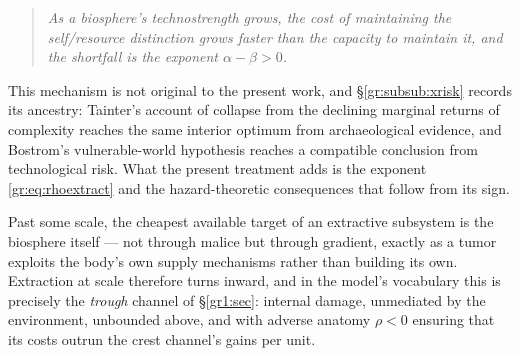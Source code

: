 \documentclass[11pt]{article}
\numberwithin{equation}{section}
\theoremstyle{plain}
\theoremstyle{definition}
\theoremstyle{remark}
\begin{document}
\begin{quote}
\emph{As a biosphere's technostrength grows, the cost of maintaining the
self/resource distinction grows faster than the capacity to maintain
it, and the shortfall is the exponent $\alpha-\beta>0$.}
\end{quote}

\noindent This mechanism is not original to the present work, and
\S\ref{gr:subsub:xrisk} records its ancestry: Tainter's account of
collapse from the declining marginal returns of complexity
\cite{Tainter88} reaches the same interior optimum from archaeological
evidence, and Bostrom's vulnerable-world hypothesis \cite{Bostrom19}
reaches a compatible conclusion from technological risk. What the
present treatment adds is the exponent \eqref{gr:eq:rhoextract} and the
hazard-theoretic consequences that follow from its sign.

Past some scale, the cheapest available target of an extractive
subsystem is the biosphere itself --- not through malice but through
gradient, exactly as a tumor exploits the body's own supply mechanisms
rather than building its own. Extraction at scale therefore turns
inward, and in the model's vocabulary this is precisely the
\emph{trough} channel of \S\ref{gr1:sec}: internal damage, unmediated by the
environment, unbounded above, and with adverse anatomy $\rho<0$ ensuring
that its costs outrun the crest channel's gains per unit.
\end{document}
